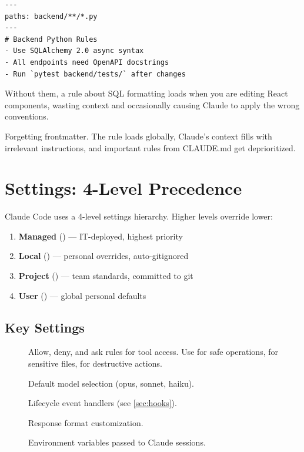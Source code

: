 \begin{verbatim}
---
paths: backend/**/*.py
---
# Backend Python Rules
- Use SQLAlchemy 2.0 async syntax
- All endpoints need OpenAPI docstrings
- Run `pytest backend/tests/` after changes
\end{verbatim}

 Without them, a rule about SQL formatting loads
when you are editing React components, wasting context and occasionally
causing Claude to apply the wrong conventions.

\begin{warnbox}
Forgetting  frontmatter. The rule loads globally,
Claude's context fills with irrelevant instructions, and important
rules from CLAUDE.md get deprioritized.
\end{warnbox}

\section{Settings: 4-Level Precedence}
\label{sec:settings}


Claude Code uses a 4-level settings hierarchy. Higher levels override lower:

\begin{enumerate}
  \item \textbf{Managed} () --- IT-deployed, highest priority
  \item \textbf{Local} () --- personal overrides, auto-gitignored
  \item \textbf{Project} () --- team standards, committed to git
  \item \textbf{User} () --- global personal defaults
\end{enumerate}

\subsection{Key Settings}

\begin{description}
  \item[] Allow, deny, and ask rules for tool access.
    Use  for safe operations,  for sensitive files,
     for destructive actions.
  \item[] Default model selection (opus, sonnet, haiku).
  \item[] Lifecycle event handlers (see \cref{sec:hooks}).
  \item[] Response format customization.
  \item[] Environment variables passed to Claude sessions.
\end{description}

